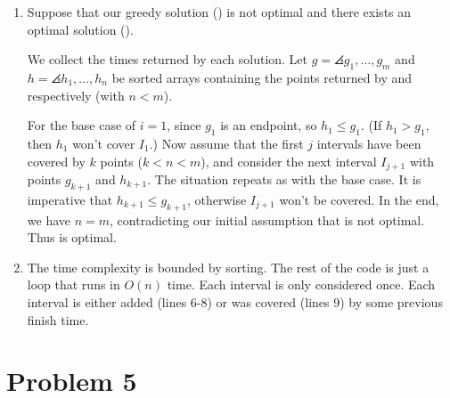 \documentclass[12pt,a4paper]{article}
\begin{document}
\begin{enumerate}
	\newpage
	\item
	Suppose that our greedy solution () is not optimal and there exists an optimal solution ().
	
	We collect the times returned by each solution. Let $g = \angles{g_1, \dots, g_m}$ and $h = \angles{h_1, \dots, h_n}$ be sorted arrays containing the points returned by  and  respectively (with $n < m$).

	For the base case of $i = 1$, since $g_1$ is an endpoint, so $h_1 \le g_1$. (If $h_1 > g_1$, then $h_1$ won't cover $I_1$.) Now assume that the first $j$ intervals have been covered by $k$ points ($k < n < m$), and consider the next interval $I_{j+1}$ with points $g_{k+1}$ and $h_{k+1}$. The situation repeats as with the base case. It is imperative that $h_{k+1} \le g_{k+1}$, otherwise $I_{j+1}$ won't be covered. In the end, we have $n = m$, contradicting our initial assumption that  is not optimal. Thus  is optimal.
	
	\item
	The time complexity is bounded by sorting. The rest of the code is just a loop that runs in $O(n)$ time. Each interval is only considered once. Each interval is either added (lines 6-8) or was covered (lines 9) by some previous finish time.

\end{enumerate}

\newpage
\section*{Problem 5}
\end{document}

